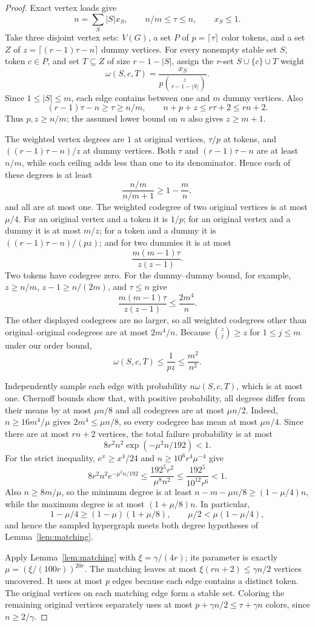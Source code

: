 \documentclass[11pt]{article}
\begin{document}
\begin{proof}
Exact vertex loads give
\[
 n=\sum_S |S|x_S,\qquad n/m\le\tau\le n,\qquad x_S\le1.
\]
Take three disjoint vertex sets: $V(G)$, a set $P$ of $p=\lceil\tau\rceil$ color tokens,
 and a set $Z$ of
$z=\lceil(r-1)\tau-n\rceil$ dummy vertices. For every nonempty stable set $S$, token
 $c\in P$, and set $T\subseteq Z$ of size $r-1-|S|$, assign the $r$-set $S\cup\{c\}\cup
 T$ weight
\[
 \omega(S,c,T)=\frac{x_S}{p\binom z{r-1-|S|}}.
\]
Since $1\le |S|\le m$, each edge contains between one and $m$ dummy vertices. Also
\[
 (r-1)\tau-n\ge\tau\ge n/m,
 \qquad n+p+z\le r\tau+2\le rn+2.
\]
Thus $p,z\ge n/m$; the assumed lower bound on $n$ also gives $z\ge m+1$.

The weighted vertex degrees are $1$ at original vertices, $\tau/p$ at tokens, and
 $((r-1)\tau-n)/z$ at dummy vertices. Both $\tau$ and $(r-1)\tau-n$
 are at least $n/m$, while each ceiling adds less than one to its denominator.
 Hence each of these degrees is at least
 \[
 \frac{n/m}{n/m+1}\ge 1-\frac{m}{n},
 \]
 and all are at most one. The weighted codegree
 of two original vertices is at most $\mu/4$. For an original vertex and a token it is
 $1/p$; for an original vertex and a dummy it is at most $m/z$; for a token and a dummy
 it is $((r-1)\tau-n)/(pz)$; and for two dummies it is at most
\[
 \frac{m(m-1)\tau}{z(z-1)}.
\]
Two tokens have codegree zero. For the dummy--dummy bound, for example,
$z\ge n/m$, $z-1\ge n/(2m)$, and $\tau\le n$ give
\[
 \frac{m(m-1)\tau}{z(z-1)}\le\frac{2m^4}{n}.
\]
The other displayed codegrees are no larger, so all weighted codegrees other than
 original--original codegrees are at most $2m^4/n$. Because
$\binom zj\ge z$ for $1\le j\le m$ under our order bound,
\[
 \omega(S,c,T)\le\frac1{pz}\le\frac{m^2}{n^2}.
\]

Independently sample each edge with probability $n\omega(S,c,T)$, which is at most one.
 Chernoff bounds show that, with positive probability, all degrees differ from their
 means by at most $\mu n/8$ and all codegrees are at most $\mu n/2$. Indeed,
$n\ge16m^4/\mu$ gives $2m^4\le\mu n/8$, so every
codegree has mean at most $\mu n/4$. Since there are at most $rn+2$
 vertices, the total failure probability is at most
\[
 8r^2n^2\exp(-\mu^2n/192)<1.
\]
For the strict inequality, $e^x\ge x^4/24$ and
$n\ge10^6r^4\mu^{-4}$ give
\[
 8r^2n^2e^{-\mu^2n/192}
 \le\frac{192^5r^2}{\mu^8n^2}
 \le\frac{192^5}{10^{12}r^6}<1.
\]
Also $n\ge8m/\mu$, so the minimum degree is at least
$n-m-\mu n/8\ge(1-\mu/4)n$, while the maximum degree is at most
$(1+\mu/8)n$. In particular,
\[
 1-\mu/4\ge(1-\mu)(1+\mu/8),
 \qquad \mu/2<\mu(1-\mu/4),
\]
and hence the sampled hypergraph meets both degree hypotheses of
Lemma~\ref{lem:matching}.

Apply Lemma~\ref{lem:matching} with $\xi=\gamma/(4r)$; its parameter is exactly
 $\mu=(\xi/(100r))^{20r}$. The matching leaves at most $\xi(rn+2)\le\gamma n/2$ vertices
 uncovered. It uses at most $p$ edges because each edge contains a distinct token. The
 original vertices on each matching edge form a stable set. Coloring the remaining
 original vertices separately uses at most $p+\gamma n/2\le\tau+\gamma n$ colors, since
 $n\ge2/\gamma$.
\end{proof}
\end{document}

